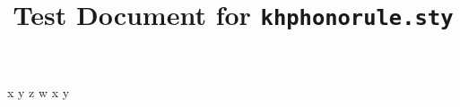 \documentclass{kharticle}
\title{Test Document for \texttt{khphonorule.sty}}
\begin{document}
\maketitle

\begin{exe}
\ex {}
\ex {}
\ex x \parrow y \penv z \phold w
\ex x \parrow y \penv {}
\end{exe}
\end{document}
